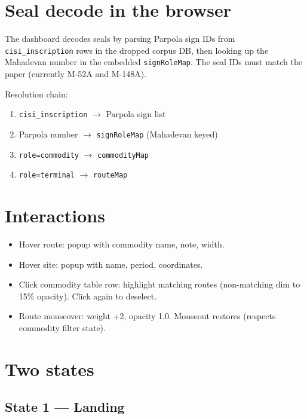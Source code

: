 \documentclass[11pt]{article}
\begin{document}
\section{Seal decode in the browser}

The dashboard decodes seals by parsing Parpola sign IDs from
\texttt{cisi\_inscription} rows in the dropped corpus DB,
then looking up the Mahadevan number in the embedded
\texttt{signRoleMap}. The seal IDs must match the paper
(currently M-52A and M-148A).

Resolution chain:
\begin{enumerate}[nosep]
\item \texttt{cisi\_inscription} $\to$ Parpola sign list
\item Parpola number $\to$ \texttt{signRoleMap} (Mahadevan keyed)
\item \texttt{role=commodity} $\to$ \texttt{commodityMap}
\item \texttt{role=terminal} $\to$ \texttt{routeMap}
\end{enumerate}

\section{Interactions}

\begin{itemize}[nosep]
\item Hover route: popup with commodity name, note, width.
\item Hover site: popup with name, period, coordinates.
\item Click commodity table row: highlight matching routes
  (non-matching dim to 15\% opacity). Click again to deselect.
\item Route mouseover: weight +2, opacity 1.0. Mouseout
  restores (respects commodity filter state).
\end{itemize}

\section{Two states}

\subsection{State 1 --- Landing}
\end{document}
